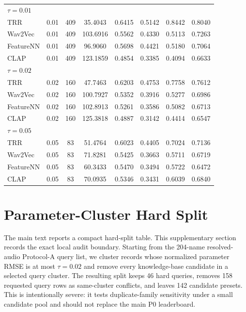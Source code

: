 \documentclass{article}
\begin{document}
\begin{table}[htbp]
{\begin{tabular}{lccccccc}
		\midrule
		\multicolumn{8}{l}{\textit{$\tau = 0.01$}} \\
		TRR & 0.01 & 409 & 35.4043 & 0.6415 & 0.5142 & 0.8442 & 0.8040 \\
		Wav2Vec & 0.01 & 409 & 103.6916 & 0.5562 & 0.4330 & 0.5113 & 0.7263 \\
		FeatureNN & 0.01 & 409 & 96.9060 & 0.5698 & 0.4421 & 0.5180 & 0.7064 \\
		CLAP & 0.01 & 409 & 123.1859 & 0.4854 & 0.3385 & 0.4094 & 0.6633 \\
		\midrule
		\multicolumn{8}{l}{\textit{$\tau = 0.02$}} \\
		TRR & 0.02 & 160 & 47.7463 & 0.6203 & 0.4753 & 0.7758 & 0.7612 \\
		Wav2Vec & 0.02 & 160 & 100.7927 & 0.5352 & 0.3916 & 0.5277 & 0.6986 \\
		FeatureNN & 0.02 & 160 & 102.8913 & 0.5261 & 0.3586 & 0.5082 & 0.6713 \\
		CLAP & 0.02 & 160 & 125.3818 & 0.4887 & 0.3142 & 0.4414 & 0.6547 \\
		\midrule
		\multicolumn{8}{l}{\textit{$\tau = 0.05$}} \\
		TRR & 0.05 & 83 & 51.4764 & 0.6023 & 0.4405 & 0.7024 & 0.7136 \\
		Wav2Vec & 0.05 & 83 & 71.8281 & 0.5425 & 0.3663 & 0.5711 & 0.6719 \\
		FeatureNN & 0.05 & 83 & 60.3433 & 0.5470 & 0.3494 & 0.5722 & 0.6472 \\
		CLAP & 0.05 & 83 & 70.0935 & 0.5346 & 0.3431 & 0.6039 & 0.6840 \\
		\bottomrule
	\end{tabular}
	}
\end{table}

\section{Parameter-Cluster Hard Split}

The main text reports a compact hard-split table. This supplementary section records the exact local audit boundary. Starting from the 204-name resolved-audio Protocol-A query list, we cluster records whose normalized parameter RMSE is at most $\tau=0.02$ and remove every knowledge-base candidate in a selected query cluster. The resulting split keeps 46 hard queries, removes 158 requested query rows as same-cluster conflicts, and leaves 142 candidate presets. This is intentionally severe: it tests duplicate-family sensitivity under a small candidate pool and should not replace the main P0 leaderboard.
\end{document}
